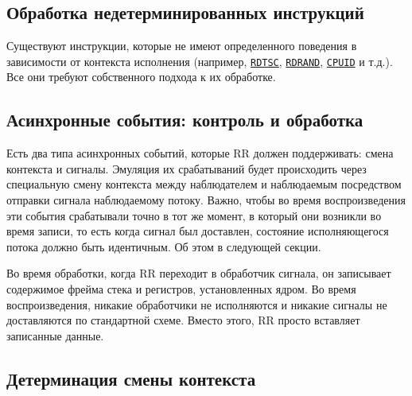 
\subsection{Обработка недетерминированных инструкций}

Существуют инструкции, которые не имеют определенного поведения в зависимости от контекста исполнения 
(например, 
\href{https://ru.wikipedia.org/wiki/Rdtsc}{\texttt{RDTSC}}, 
\href{https://en.wikipedia.org/wiki/RDRAND}{\texttt{RDRAND}}, 
\href{https://en.wikipedia.org/wiki/CPUID}{\texttt{CPUID}} и т.д.). Все они требуют собственного подхода к их обработке.


\subsection{Асинхронные события: контроль и обработка}

Есть два типа асинхронных событий, которые RR должен поддерживать: смена контекста и сигналы.
Эмуляция их срабатываний будет происходить через специальную смену контекста между наблюдателем и наблюдаемым посредством отправки 
сигнала наблюдаемому потоку. Важно, чтобы во время воспроизведения эти события срабатывали точно в тот же момент, 
в который они возникли во время записи, то есть когда сигнал был доставлен, состояние исполняющегося потока должно быть идентичным.
Об этом в следующей секции.

Во время обработки, когда RR переходит в обработчик сигнала, он записывает содержимое фрейма стека и регистров, установленных ядром. 
Во время воспроизведения, никакие обработчики не исполняются и никакие сигналы не доставляются по стандартной схеме. 
Вместо этого, RR просто вставляет записанные данные.

\subsection{Детерминация смены контекста}

